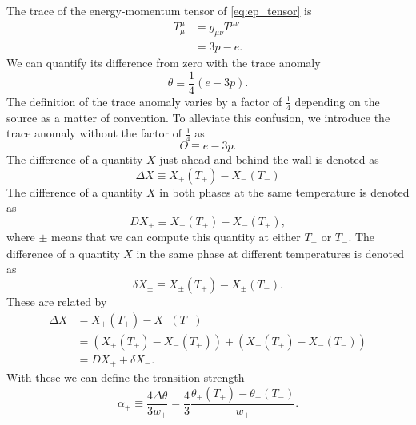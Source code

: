 
The trace of the energy-momentum tensor of \eqref{eq:ep_tensor} is
\begin{align}
T^\mu_\mu
&= g_{\mu \nu} T^{\mu \nu} \\
&=3p - e.
\end{align}
We can quantify its difference from zero with the trace anomaly
\cites[eq. 7.24]{lecture_notes}[eq. 28]{giese_2020}
\begin{equation}
\theta \equiv \frac{1}{4}(e-3p).
\label{eq:theta}
\end{equation}
The definition of the trace anomaly varies by a factor of $\frac{1}{4}$ depending on the source as a matter of convention.
To alleviate this confusion, we introduce the trace anomaly without the factor of $\frac{1}{4}$ as
\begin{equation}
\Theta \equiv e - 3p.
\label{eq:theta_big}
\end{equation}
The difference of a quantity $X$ just ahead and behind the wall is denoted as
\begin{equation}
\Delta X
\equiv X_+(T_+) - X_-(T_-) %
\end{equation}
The difference of a quantity $X$ in both phases at the same temperature is denoted as
\begin{equation}
DX_\pm \equiv X_+(T_\pm) - X_-(T_\pm),
\end{equation}
where $\pm$ means that we can compute this quantity at either $T_+$ or $T_-$.
The difference of a quantity $X$ in the same phase at different temperatures is denoted as
\begin{equation}
\delta X_\pm \equiv X_\pm(T_+) - X_\pm(T_-).
\end{equation}
These are related by
\begin{align}
\Delta X
&= X_+(T_+) - X_-(T_-) \\
&= \left( X_+(T_+) - X_-(T_+) \right) + \left( X_-(T_+) - X_-(T_-) \right) \\
&= DX_+ + \delta X_-.
\label{eq:delta_relation}
\end{align}
With these we can define the transition strength
\begin{equation}
\alpha_+
\equiv \frac{4 \Delta \theta}{3 w_+}
= \frac{4}{3} \frac{\theta_+(T_+) - \theta_-(T_-)}{w_+}.
\label{eq:alpha_plus}
\end{equation}
